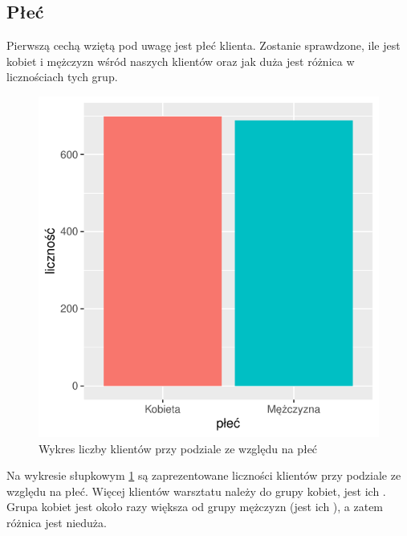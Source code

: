 \documentclass{article}\usepackage[]{graphicx}\usepackage[]{xcolor}
\makeatletter
\def\maxwidth{ %
  \ifdim\Gin@nat@width>\linewidth
    \linewidth
  \else
    \Gin@nat@width
  \fi
}
\newenvironment{knitrout}{}{} %
\makeatother
\begin{document}
\subsection{Płeć}

Pierwszą cechą wziętą pod uwagę jest płeć klienta. Zostanie sprawdzone, ile jest kobiet i mężczyzn wśród naszych klientów oraz jak duża jest różnica w licznościach tych grup.

\begin{knitrout}
\color{fgcolor}\begin{figure}[H]

{\centering \includegraphics[width=\maxwidth]{figure/fig_plec-1} 

}

\caption[Wykres liczby klientów przy podziale ze względu na płeć]{Wykres liczby klientów przy podziale ze względu na płeć}\label{fig:fig_plec}
\end{figure}

\end{knitrout}

Na wykresie słupkowym \ref{fig:fig_plec} są zaprezentowane liczności klientów przy podziale ze względu na płeć. Więcej klientów warsztatu należy do grupy kobiet, jest ich . Grupa kobiet jest około 
razy większa od grupy mężczyzn (jest ich ), a zatem różnica jest nieduża.
\end{document}
